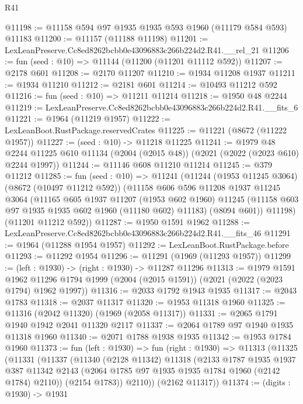 \begin{lexlean}{R41}
\begin{coremodule}
@11198 := @11158 @594 @97 @1935 @1935 @593 @1960 (@11179 @584 @593) @11183
@11200 := @11157 (@11188 @11198)
@11201 := LexLeanPreserve.Cc8ed8262bcbb0e43096883c266b224d2.R41.__rel_21
@11206 := fun (seed : @10) => @11144 (@11200 (@11201 @11112 @592))
@11207 := @2178 @601
@11208 := @2170 @11207
@11210 := @1934 @11208 @1937
@11211 := @1934 @11210
@11212 := @2181 @601
@11214 := @10493 @11212 @592
@11216 := fun (seed : @10) => @11211 @11214
@11218 := @1950 @48 @2244
@11219 := LexLeanPreserve.Cc8ed8262bcbb0e43096883c266b224d2.R41.__fits_6
@11221 := @1964 (@11219 @1957)
@11222 := LexLeanBoot.RustPackage.reservedCrates
@11225 := @11221 (@8672 (@11222 @1957))
@11227 := (seed : @10) -> @11218 @11225
@11241 := @1979
    @48
    @2244
    @11225
    @610
    @11134
    (@2004 (@2015 @48))
    (@2021 (@2022 (@2023 @610) @2244 @1997))
@11244 := @11146 @608 @11210 @11214
@11245 := @379 @11212
@11285 := fun (seed : @10) =>
  @11241
    (@11244
      (@1953 @11245 @3064)
      (@8672 (@10497 @11212 @592))
      (@11158
        @606
        @596
        @11208
        @1937
        @11245
        @3064
        (@11165
          @605
          @1937
          @11207
          (@1953 @602 @1960)
          @11245
          (@11158 @603 @97 @1935 @1935 @602 @1960 (@11180 @602) @11183)
          (@8094 @601))
        @11198)
      (@11201 @11212 @592))
@11287 := @1950 @1591 @1962
@11288 := LexLeanPreserve.Cc8ed8262bcbb0e43096883c266b224d2.R41.__fits_46
@11291 := @1964 (@11288 @1954 @1957)
@11292 := LexLeanBoot.RustPackage.before
@11293 := @11292 @1954
@11296 := @11291 (@1969 (@11293 @1957))
@11299 := (left : @1930) -> (right : @1930) -> @11287 @11296
@11313 := @1979
    @1591
    @1962
    @11296
    @1794
    @1999
    (@2004 (@2015 @1591))
    (@2021 (@2022 (@2023 @1794) @1962 @1997))
@11316 := @2033 @1792 @1943 @1935
@11317 := @2043 @1783
@11318 := @2037 @11317
@11320 := @1953 @11318 @1960
@11325 := @11316 (@2042 @11320) (@1969 (@2058 @11317))
@11331 := @2065 @1791 @1940 @1942 @2041 @11320 @2117
@11337 := @2064 @1789 @97 @1940 @1935 @11318 @1960
@11340 := @2071 @1788 @1938 @1935
@11342 := @1953 @1784 @1960
@11373 := fun (left : @1930) =>
  fun (right : @1930) =>
  @11313
    (@11325
      (@11331
        (@11337
          (@11340
            (@2128 @11342)
            @11318
            (@2133
              @1787
              @1935
              @1937
              @387
              @11342
              @2143
              (@2064 @1785 @97 @1935 @1935 @1784 @1960 (@2142 @1784) @2110))
            (@2154 @1783))
          @2110))
      (@2162 @11317))
@11374 := (digits : @1930) -> @1931

\end{coremodule}
\end{lexlean}
